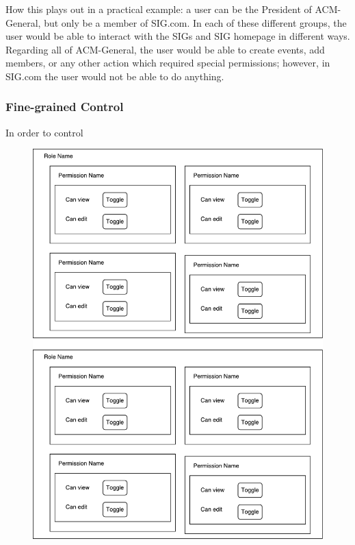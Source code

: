 \documentclass{article}
\begin{document}
How this plays out in a practical example: a user can be the President of ACM-General,
but only be a member of SIG.com. In each of these different groups, the user would
be able to interact with the SIGs and SIG homepage in different ways. Regarding
all of ACM-General, the user would be able to create events, add members, or any
other action which required special permissions; however, in SIG.com the user
would not be able to do anything.

\subsubsection{Fine-grained Control}
In order to control 

\begin{figure}[!htb]
    \includegraphics[width=\textwidth,height=\textheight,keepaspectratio]{figures/permissions.pdf}
\end{figure}
\end{document}
